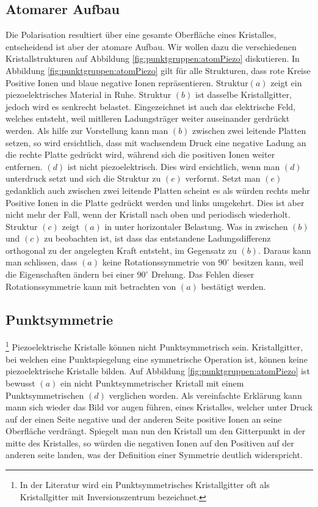 \subsection{Atomarer Aufbau}
Die Polarisation resultiert über eine gesamte Oberfläche eines Kristalles, entscheidend ist aber der atomare Aufbau.
Wir wollen dazu die verschiedenen Kristallstrukturen auf Abbildung \ref{fig:punktgruppen:atomPiezo} diskutieren.
In Abbildung \ref{fig:punktgruppen:atomPiezo} gilt für alle Strukturen, dass rote Kreise Positive Ionen und blaue negative Ionen repräsentieren. 
Struktur$(a)$ zeigt ein piezoelektrisches Material in Ruhe. Struktur $(b)$ ist dasselbe Kristallgitter, jedoch wird es senkrecht belastet. 
Eingezeichnet ist auch das elektrische Feld, welches entsteht, weil mitlleren Ladungsträger weiter auseinander gerdrückt werden.
Als hilfe zur Vorstellung kann man $(b)$ zwischen zwei leitende Platten setzen, 
so wird ersichtlich, dass mit wachsendem Druck eine negative Ladung an die rechte Platte gedrückt wird,
während sich die positiven Ionen weiter entfernen. 
$(d)$ ist nicht piezoelektrisch.
Dies wird ersichtlich, wenn man $(d)$ unterdruck setzt und sich die Struktur zu $(e)$ verformt.
Setzt man  $(e)$ gedanklich auch zwischen zwei leitende Platten scheint es als würden rechts mehr Positive Ionen in die Platte gedrückt werden 
und links umgekehrt.
Dies ist aber nicht mehr der Fall, wenn der Kristall nach oben und periodisch wiederholt.
Struktur $(c)$ zeigt $(a)$ in unter horizontaler Belastung. 
Was in zwischen $(b)$ und $(c)$ zu beobachten ist, ist dass das entstandene Ladungsdifferenz orthogonal zu der angelegten Kraft entsteht,
im Gegensatz zu $(b)$.
Daraus kann man schlissen, dass $(a)$ keine Rotationssymmetrie von $90^\circ$ besitzen kann, weil die Eigenschaften ändern bei einer $90^\circ$ Drehung. 
Das Fehlen dieser Rotationssymmetrie kann mit betrachten von $(a)$ bestätigt werden. 

\subsection{Punktsymmetrie}\footnote{In der Literatur wird ein Punktsymmetrisches Kristallgitter oft als Kristallgitter mit Inversionszentrum bezeichnet.}
Piezoelektrische Kristalle können nicht Punktsymmetrisch sein.
Kristallgitter, bei welchen eine Punktspiegelung eine symmetrische Operation ist, können keine piezoelektrische Kristalle bilden.
Auf Abbildung \ref{fig:punktgruppen:atomPiezo} ist bewusst $(a)$ ein nicht Punktsymmetrischer Kristall mit einem Punktsymmetrischen $(d)$ verglichen worden.
Als vereinfachte Erklärung kann mann sich wieder das Bild vor augen führen, eines Kristalles, 
welcher unter Druck auf der einen Seite negative und der anderen Seite positive Ionen an seine Oberfläche verdrängt.
Spiegelt man nun den Kristall um den Gitterpunkt in der mitte des Kristalles, so würden die negativen Ionen auf den Positiven auf der anderen seite landen,
was der Definition einer Symmetrie deutlich widerspricht.

